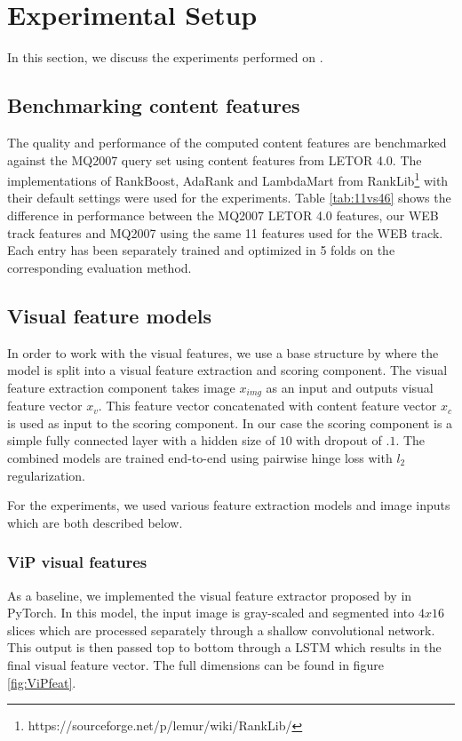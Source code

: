 \section{Experimental Setup}\label{sec:experiments}
In this section, we discuss the experiments performed on \datasetname. 


\subsection{Benchmarking content features}
The quality and performance of the computed content features are benchmarked against the MQ2007 query set using content features from LETOR 4.0. The implementations of RankBoost, AdaRank and LambdaMart from RankLib\footnote{https://sourceforge.net/p/lemur/wiki/RankLib/} with their default settings were used for the experiments. Table \ref{tab:11vs46} shows the difference in performance between the MQ2007 LETOR 4.0 features, our WEB track features and MQ2007 using the same 11 features used for the WEB track. Each entry has been separately trained and optimized in 5 folds on the corresponding evaluation method. 

\subsection{Visual feature models}
In order to work with the visual features, we use a base structure by \citet{fan2017learning} where the model is split into a visual feature extraction and scoring component. The visual feature extraction component takes image $x_{img}$ as an input and outputs visual feature vector $x_{v}$. This feature vector concatenated with content feature vector $x_{c}$ is used as input to the scoring component. In our case the scoring component is a simple fully connected layer with a hidden size of $10$ with dropout of $.1$. The combined models are trained end-to-end using pairwise hinge loss with $l_2$ regularization. 

For the experiments, we used various feature extraction models and image inputs which are both described below.


\subsubsection{ViP visual features}
As a baseline, we implemented the visual feature extractor proposed by \citet{fan2017learning} in PyTorch. In this model, the input image is gray-scaled and segmented into $4x16$ slices which are processed separately through a shallow convolutional network. This output is then passed top to bottom through a LSTM which results in the final visual feature vector. The full dimensions can be found in figure \ref{fig:ViPfeat}.

